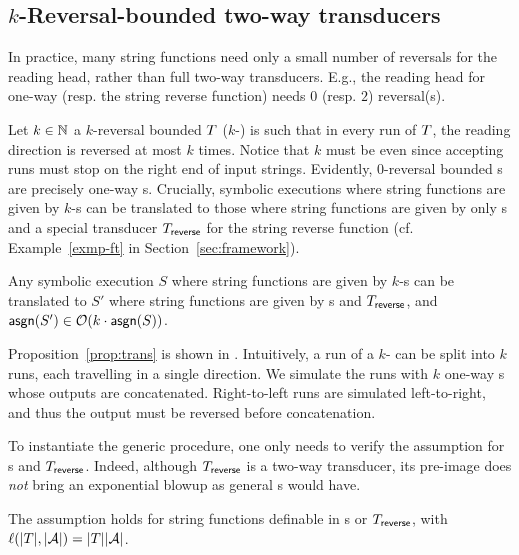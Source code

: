 
\subsection{$k$-Reversal-bounded two-way transducers} \label{subsec:krb}
 
In practice, many string functions need only a small number of reversals for the reading head, rather than full two-way transducers. 
E.g., the reading head for one-way \PT{} (resp. the string reverse function) needs $0$ (resp. $2$) reversal(s).

Let $k \in \mathbb{N}$ a $k$-reversal bounded \PPT{} $T$ ($k$-\RBPPT{}) is such that in every run of $T$, the reading direction is reversed at most $k$ times. 
Notice that $k$ must be even since accepting runs must stop on the right end of input strings. 
Evidently, $0$-reversal bounded \PPT{}s are precisely one-way \PT{}s.   
Crucially, symbolic executions where string functions are given by $k$-\RBPPT{}s can be translated to those where string functions are given by only \PT{}s and a special transducer $T_{\sf reverse}$ for the string reverse function  (cf. Example~\ref{exmp-ft} in Section~\ref{sec:framework}).  

\begin{proposition} \label{prop:trans}
	Any symbolic execution $S$ where string functions are given by $k$-\RBPPT{}s can be translated to $S'$ where string functions are given by \PT{}s and $T_{\sf reverse}$, and $ \mathsf{asgn}(S')\in \mathcal{O}(k\cdot \mathsf{asgn}(S))$. 
\end{proposition}

Proposition~\ref{prop:trans} is shown in
.
Intuitively, a run of a $k$-\RBPPT{} can be split into $k$ runs, each travelling in a single direction.
We simulate the runs with $k$ one-way \PT{}s whose outputs are concatenated.
Right-to-left runs are simulated left-to-right, and thus the output must be reversed before concatenation.


To instantiate the generic procedure, one only needs to verify the  \prerec{} assumption for \PT{}s and $T_{\sf reverse}$. Indeed, although $T_{\sf reverse}$ is a two-way transducer, its pre-image does \emph{not} bring an exponential blowup as general \PPT{}s would have. 

\begin{lemma}\label{lem-1pt}
	The \prerec{} assumption holds for string functions definable in \PT{}s or $T_{\sf reverse}$, with $\ell(|T|, |\mathcal{A}|) = |T||\mathcal{A}|$.
\end{lemma}

